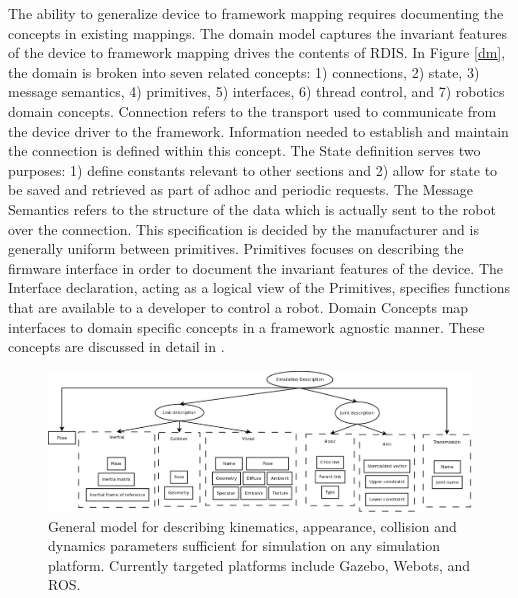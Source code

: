 The ability to generalize device to framework mapping requires documenting the concepts in existing mappings.  The domain model captures the invariant features of the device to framework mapping drives the contents of RDIS.  In Figure \ref{dm}, the domain is broken into seven related concepts: 1) connections, 2) state, 3) message semantics, 4) primitives, 5) interfaces, 6) thread control, and 7) robotics domain concepts.  {\sc Connection} refers to the transport used to communicate from the device driver to the framework.  Information needed to establish and maintain the connection is defined within this concept. The {\sc State} definition serves two purposes: 1) define constants relevant to other sections and 2) allow for state to be saved and retrieved as part of adhoc and periodic requests.   The {\sc Message Semantics} refers to the structure of the data which is actually sent to the robot over the connection. This specification is decided by the manufacturer and is generally uniform between primitives.   {\sc Primitives} focuses on describing the firmware interface in order to document the invariant features of the device.   The {\sc Interface} declaration, acting as a logical view of the {\sc Primitives},  specifies functions that are available to a developer to control a robot.   {\sc Domain Concepts} map interfaces to domain specific concepts in a framework agnostic manner.  These concepts are discussed in detail in \cite{Anderson2012}.

\begin{figure}[thpb]
      \centering
      \includegraphics[width=6in]{kvc.pdf}
      \caption{General model for describing kinematics, appearance, collision and dynamics parameters sufficient for simulation on any simulation platform.  Currently targeted platforms include Gazebo, Webots, and ROS.}
      \label{kvc}
\end{figure}


